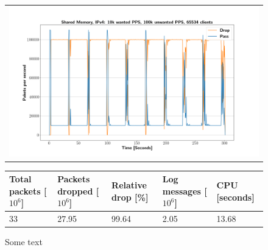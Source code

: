 \begin{figure}[!h]
	\label{fig:simplefail2ban:shm:ip4:100k}
	\centering
	\scriptsize
	\begin{tabular}{c}
    	\centerline{\includegraphics[width=1.2\textwidth]{images/simplefail2ban_shm_ipv4_v10k_iv100k_c65534.png}}
	\end{tabular}
	\begin{tabular}{lllll}
		\toprule
		\textbf{Total packets [$10^6$]} & \textbf{Packets dropped [$10^6$]} & \textbf{Relative drop [\%]} & \textbf{Log messages [$10^6$]} & \textbf{CPU [seconds]} \\ \midrule 
		33 & 27.95 & 99.64 & 2.05 & 13.68 \\
		\bottomrule
	\end{tabular}
	\caption[Simplefail2ban, Shared Memory, IPv4, 1m \ac{PPS}]{Some text}
\end{figure}

